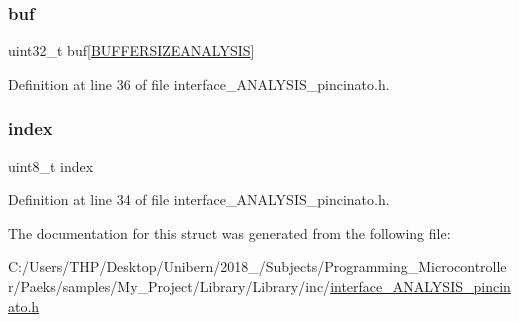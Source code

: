 \mbox{\label{struct_data_buffer_a879b8a6fa7f2626814e9c149bdfc3139}} 
\subsubsection{\texorpdfstring{buf}{buf}}
{\footnotesize\ttfamily uint32\+\_\+t buf\mbox{[}\mbox{\hyperlink{interface___a_n_a_l_y_s_i_s__pincinato_8h_a8d58dfb2133bff91e140c30b2c72ed04}{B\+U\+F\+F\+E\+R\+S\+I\+Z\+E\+A\+N\+A\+L\+Y\+S\+IS}}\mbox{]}}



Definition at line 36 of file interface\+\_\+\+A\+N\+A\+L\+Y\+S\+I\+S\+\_\+pincinato.\+h.

\mbox{\label{struct_data_buffer_aae5a12e607d0f782506d9e6ec6179c64}} 
\subsubsection{\texorpdfstring{index}{index}}
{\footnotesize\ttfamily uint8\+\_\+t index}



Definition at line 34 of file interface\+\_\+\+A\+N\+A\+L\+Y\+S\+I\+S\+\_\+pincinato.\+h.



The documentation for this struct was generated from the following file\+:\begin{DoxyCompactItemize}
\item 
C\+:/\+Users/\+T\+H\+P/\+Desktop/\+Unibern/2018\+\_/\+Subjects/\+Programming\+\_\+\+Microcontroller/\+Paeks/samples/\+My\+\_\+\+Project/\+Library/\+Library/inc/\mbox{\hyperlink{interface___a_n_a_l_y_s_i_s__pincinato_8h}{interface\+\_\+\+A\+N\+A\+L\+Y\+S\+I\+S\+\_\+pincinato.\+h}}\end{DoxyCompactItemize}

